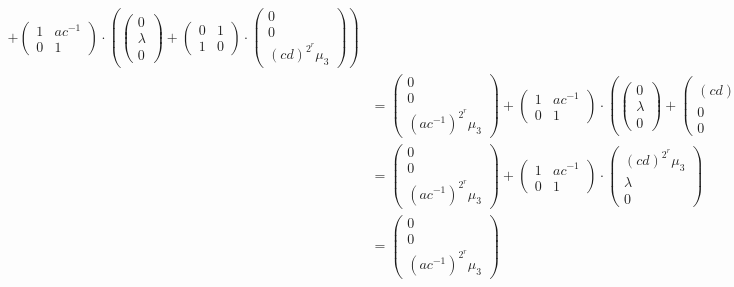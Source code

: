 \begin{align*}
	+ 
	\left(\begin{matrix} 1 & ac^{-1} \\ 0 & 1 \end{matrix}\right)\cdot
	\left(
			\left(\begin{matrix} 0 \\ \lambda \\ 0 \end{matrix}\right)
			+
			\left(\begin{matrix} 0 & 1 \\ 1 & 0 \end{matrix}\right)\cdot
			\left(\begin{matrix} 0 \\ 0 \\ (cd)^{2^r}\mu_3 \end{matrix}\right)
			\right)
	\\
	&=
\left(\begin{matrix} 0 \\ 0 \\ (ac^{-1})^{2^r}\mu_3 \end{matrix}\right)
	+ 
	\left(\begin{matrix} 1 & ac^{-1} \\ 0 & 1 \end{matrix}\right)\cdot
	\left(
			\left(\begin{matrix} 0 \\ \lambda \\ 0 \end{matrix}\right)
			+
			\left(\begin{matrix} (cd)^{2^r}\mu_3 \\ 0 \\ 0 \end{matrix}\right)
			\right)\\
	&=
\left(\begin{matrix} 0 \\ 0 \\ (ac^{-1})^{2^r}\mu_3 \end{matrix}\right)
	+ 
	\left(\begin{matrix} 1 & ac^{-1} \\ 0 & 1 \end{matrix}\right)\cdot
	\left(\begin{matrix} (cd)^{2^r}\mu_3 \\ \lambda \\ 0 \end{matrix}\right)\\
	&=
\left(\begin{matrix} 0 \\ 0 \\ (ac^{-1})^{2^r}\mu_3 \end{matrix}\right)

\end{align*}
